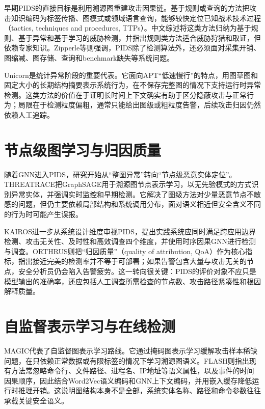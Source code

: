 早期PIDS的直接目标是利用溯源图重建攻击因果链。基于规则或查询的方法把攻击知识编码为标签传播、图模式或领域语言查询，能够较快定位已知战术技术过程（tactics, techniques and procedures, TTPs）。中文综述将这类方法归纳为基于规则、基于异常和基于学习的威胁检测，并指出规则类方法适合威胁狩猎和取证，但依赖专家知识\citep{leng2022review}。Zipperle等则强调，PIDS除了检测算法外，还必须面对采集开销、图缩减、图存储、查询和benchmark缺失等系统问题\citep{zipperle2023survey}。

Unicorn是统计异常阶段的重要代表。它面向APT“低速慢行”的特点，用图草图和固定大小的长期结构摘要表示系统行为，在不保存完整图的情况下支持运行时异常检测\citep{unicorn2020}。这类方法的价值在于证明长时间上下文确实有助于区分隐蔽攻击与正常行为；局限在于检测粒度偏粗，通常只能给出图级或粗粒度告警，后续攻击归因仍然依赖人工追踪。

\section{节点级图学习与归因质量}

随着GNN进入PIDS，研究开始从“整图异常”转向“节点级恶意实体定位”。THREATRACE把GraphSAGE用于溯源图节点表示学习，以无先验模式的方式识别异常实体，并强调实时监控和早期检测\citep{threatrace2022}。它解决了图级方法对少量恶意节点不敏感的问题，但仍主要依赖局部结构和系统调用分布，面对语义相近但安全含义不同的行为时可能产生误报。

KAIROS进一步从系统设计维度审视PIDS，提出实践系统应同时满足跨应用边界检测、攻击无关性、及时性和高效调查四个维度，并使用时序因果GNN进行检测与调查\citep{kairos2024}。ORTHRUS则把“归因质量”（quality of attribution, QoA）作为核心指标，指出接近完美的检测率并不等于可部署；如果告警包含大量与攻击无关的节点，安全分析员仍会陷入告警疲劳\citep{orthrus2025}。这一转向很关键：PIDS的评价对象不应只是模型输出的准确率，还应包括人工调查所需检查的节点数、攻击路径紧凑性和根因解释质量。

\section{自监督表示学习与在线检测}

MAGIC代表了自监督图表示学习路线。它通过掩码图表示学习缓解攻击样本稀缺问题，在只依赖正常数据或有限标签的情况下学习溯源图语义\citep{magic2024}。FLASH则指出现有方法常忽略命令行、文件路径、进程名、IP地址等语义属性，以及事件的时间因果顺序，因此结合Word2Vec语义编码和GNN上下文编码，并用嵌入缓存降低运行时推理开销\citep{flash2024}。这说明图结构本身不是全部，系统实体名称、路径和命令参数往往承载关键安全语义。

